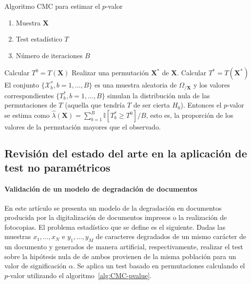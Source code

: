 \begin{algorithm}
	\caption{Algoritmo CMC para estimar el $p$-valor}
	\label{alg:CMC-pvalue}
	\begin{algorithmic}[1]
	\REQUIRE
		\begin{enumerate}[a]
		\item Muestra $\mathbf{X}$
		\item Test estadístico $T$
		\item Número de iteraciones $B$
		\end{enumerate}
		\STATE Calcular $T^0 = T(\mathbf{X})$
			\STATE Realizar una permutación $\mathbf{X}^*$ de  $\mathbf{X}$.
			\STATE Calcular $T^* = T(\mathbf{X}^*)$
		\ENDFOR
		\STATE El conjunto $\{ \mathcal{X}^*_b, b = 1, \dots, B \}$ es una muestra aleatoria de $\Omega_{/\mathbf{X}}$ y los valores correspondientes $\{ T^*_b, b = 1, \dots, B \}$ simulan la distribución nula de las permutaciones de $T$ (aquella que tendría $T$ de ser cierta $H_0$). Entonces el $p$-valor se estima como $\hat{\lambda}(\mathbf{X}) = \sum\limits_{b=1}^B \mathbb{I}[T_b^* \geq T^0]/B$, esto es, la proporción de los valores de la permutación mayores que el observado.
	\end{algorithmic}
\end{algorithm}
	
\subsection{Revisión del estado del arte en la aplicación de test no paramétricos}
 
\paragraph{Validación de un modelo de degradación de documentos} \cite{KANUNGO00} En este artículo se presenta un modelo de la degradación en documentos producida por la digitalización de documentos impresos o la realización de fotocopias. El problema estadístico que se define es el siguiente. Dadas las muestras $x_1, \dots, x_N$ e $y_1, \dots, y_M$ de caracteres degradados de un mismo carácter de un documento y generados de manera artificial, respectivamente, realizar el test sobre la hipótesis nula de de ambos  provienen de la misma población para un valor de significación $\alpha$. Se aplica un test basado en permutaciones calculando el $p$-valor utilizando el algoritmo~\ref{alg:CMC-pvalue}.

